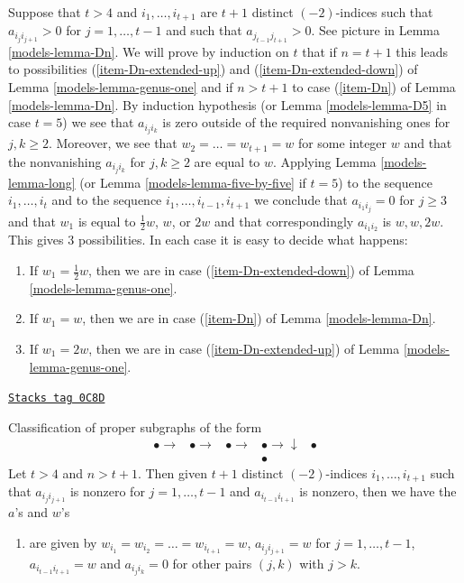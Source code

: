 Suppose that $t > 4$ and $i_1, \ldots, i_{t + 1}$ are $t + 1$
distinct $(-2)$-indices such that $a_{i_ji_{j + 1}} > 0$
for $j = 1, \ldots, t - 1$ and such that $a_{j_{t - 1}j_{t + 1}} > 0$.
See picture in Lemma \ref{models-lemma-Dn}. We will prove by induction on $t$
that if $n = t + 1$ this leads to possibilities
(\ref{item-Dn-extended-up}) and (\ref{item-Dn-extended-down})
of Lemma \ref{models-lemma-genus-one} and if $n > t + 1$ to
case (\ref{item-Dn}) of Lemma \ref{models-lemma-Dn}.
By induction hypothesis (or Lemma \ref{models-lemma-D5} in case $t = 5$)
we see that $a_{i_ji_k}$ is zero outside of the required
nonvanishing ones for $j, k \geq 2$.
Moreover, we see that $w_2 = \ldots = w_{t + 1} = w$ for some integer
$w$ and that the nonvanishing $a_{i_ji_k}$ for $j, k \geq 2$ are
equal to $w$. Applying Lemma \ref{models-lemma-long}
(or Lemma \ref{models-lemma-five-by-five} if $t = 5$) to the sequence
$i_1, \ldots, i_t$ and to the sequence
$i_1, \ldots, i_{t - 1}, i_{t + 1}$ we conclude that
$a_{i_1 i_j} = 0$ for $j \geq 3$ and that
$w_1$ is equal to $\frac{1}{2}w$, $w$, or $2w$
and that correspondingly $a_{i_1i_2}$ is $w, w, 2w$.
This gives $3$ possibilities. In each case it is easy to
decide what happens:
\begin{enumerate}
\item If $w_1 = \frac{1}{2}w$, then we are in case
(\ref{item-Dn-extended-down}) of Lemma \ref{models-lemma-genus-one}.
\item If $w_1 = w$, then we are in case
(\ref{item-Dn}) of Lemma \ref{models-lemma-Dn}.
\item If $w_1 = 2w$, then we are in case
(\ref{item-Dn-extended-up}) of Lemma \ref{models-lemma-genus-one}.
\end{enumerate}

\begin{lemma}[Dn]
\label{models-lemma-Dn}
\href{https://stacks.math.columbia.edu/tag/0C8D}{\texttt{Stacks tag 0C8D}}

Classification of proper subgraphs of the form
$$
\begin{array}{ccccc}\bullet \longrightarrow & \bullet \longrightarrow & \bullet \longrightarrow & \bullet \longrightarrow\downarrow & \bullet \\  &  &  & \bullet & \end{array}
$$
Let $t > 4$ and $n > t + 1$. Then given $t + 1$ distinct
$(-2)$-indices $i_1, \ldots, i_{t + 1}$ such that $a_{i_ji_{j + 1}}$
is nonzero for $j = 1, \ldots, t - 1$ and $a_{i_{t - 1}i_{t + 1}}$
is nonzero, then we have the $a$'s and $w$'s
\begin{enumerate}
\item
\label{models-item-Dn}
are given by $w_{i_1} = w_{i_2} = \ldots = w_{i_{t + 1}} = w$,
$a_{i_ji_{j + 1}} = w$ for $j = 1, \ldots, t - 1$,
$a_{i_{t - 1}i_{t + 1}} = w$ and $a_{i_ji_k} = 0$ for other
pairs $(j, k)$ with $j > k$.
\end{enumerate}
\end{lemma}

